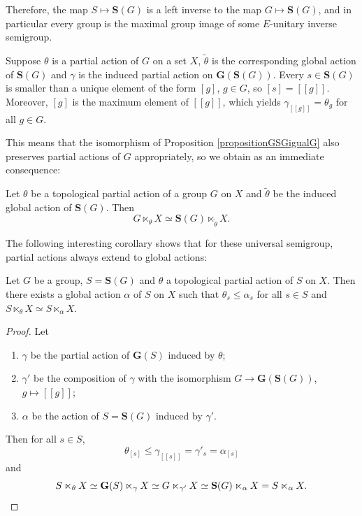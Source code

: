 Therefore, the map $S\mapsto\mathbf{S}(G)$ is a left inverse to the map $G\mapsto\mathbf{S}(G)$, and in particular every group is the maximal group image of some $E$-unitary inverse semigroup.%

Suppose $\theta$ is a partial action of $G$ on a set $X$, $\widetilde{\theta}$ is the corresponding global action of $\mathbf{S}(G)$ and $\gamma$ is the induced partial action on $\mathbf{G}(\mathbf{S}(G))$. Every $s\in\mathbf{S}(G)$ is smaller than a unique element of the form $[g]$, $g\in G$, so $[s]=[[g]]$. Moreover, $[g]$ is the maximum element of $[[g]]$, which yields $\gamma_{[[g]]}=\theta_g$ for all $g\in G$.

This means that the isomorphism of Proposition \ref{propositionGSGigualG} also preserves partial actions of $G$ appropriately, so we obtain as an immediate consequence:

\begin{corollary}
Let $\theta$ be a topological partial action of a group $G$ on $X$ and $\widetilde{\theta}$ be the induced global action of $\mathbf{S}(G)$. Then
\[G\ltimes_\theta X \simeq \mathbf{S}(G)\ltimes_{\widetilde{\theta}} X.\]
\end{corollary}

The following interesting corollary shows that for these universal semigroup, partial actions always extend to global actions:

\begin{corollary}
Let $G$ be a group, $S=\mathbf{S}(G)$ and $\theta$ a topological partial action of $S$ on $X$. Then there exists a global action $\alpha$ of $S$ on $X$ such that $\theta_s\leq\alpha_s$ for all $s\in S$ and $S\ltimes_\theta X\simeq S\ltimes_\alpha X$.
\end{corollary}
\begin{proof}
Let
\begin{enumerate}
\item $\gamma$ be the partial action of $\mathbf{G}(S)$ induced by $\theta$;
\item $\gamma'$ be the composition of $\gamma$ with the isomorphism $G\to\mathbf{G}(\mathbf{S}(G))$, $g\mapsto [[g]]$;
\item $\alpha$ be the action of $S=\mathbf{S}(G)$ induced by $\gamma'$.
\end{enumerate}
Then for all $s\in S$,
\[\theta_{[s]}\leq\gamma_{[[s]]}=\gamma'_{s}=\alpha_{[s]}\]
and
\[S\ltimes_\theta X\simeq \mathbf{G}(S)\ltimes_{\gamma} X\simeq G\ltimes_{\gamma'}X\simeq \mathbf{S}(G)\ltimes_\alpha X= S\ltimes_\alpha X.\qedhere\]
\end{proof}